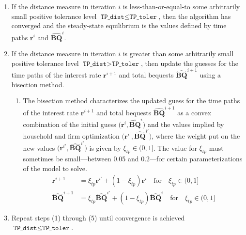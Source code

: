 \documentclass[letterpaper,12pt]{article}
\theoremstyle{definition}
\begin{document}
\begin{enumerate}
\begin{enumerate}
        \item If the distance measure in iteration $i$ is less-than-or-equal-to some arbitrarily small positive tolerance level $\texttt{TP\_dist}\leq\texttt{TP\_toler}$, then the algorithm has converged and the steady-state equilibrium is the values defined by time paths $\bm{r}^i$ and $\bm{\hat{BQ}}^i$.

        \item If the distance measure in iteration $i$ is greater than some arbitrarily small positive tolerance level $\texttt{TP\_dist} > \texttt{TP\_toler}$, then update the guesses for the time paths of the interest rate $\bm{r}^{i+1}$ and total bequests $\bm{\hat{BQ}}^{i+1}$ using a bisection method.
        \begin{enumerate}
          \item The bisection method characterizes the updated guess for the time paths of the interest rate $\bm{r}^{i+1}$ and total bequests $\bm{\hat{BQ}}^{i+1}$ as a convex combination of the initial guess $\bigl(\bm{r}^{i},\bm{\hat{BQ}}^i\bigr)$ and the values implied by household and firm optimization $\bigl(\bm{r}^{i'},\bm{\hat{BQ}}^{i'}\bigr)$, where the weight put on the new values $\bigl(\bm{r}^{i'},\bm{\hat{BQ}}^{i'}\bigr)$ is given by $\xi_{tp}\in(0, 1]$. The value for $\xi_{tp}$ must sometimes be small---between 0.05 and 0.2---for certain parameterizations of the model to solve.
          \begin{align}
            \bm{r}^{i+1} &= \xi_{tp}\bm{r}^{i'} + (1 - \xi_{tp})\bm{r}^{i} \quad\text{for}\quad \xi_{tp}\in(0,1] \label{EqOGmodelUpdate_r_tp} \\
            \bm{\hat{BQ}}^{i+1} &= \xi_{tp}\bm{\hat{BQ}}^{i'} + (1 - \xi_{tp})\bm{\hat{BQ}}^{i} \quad\text{for}\quad \xi_{tp}\in(0,1] \label{EqOGmodelUpdate_BQ_tp}
          \end{align}

        \end{enumerate}

        \item Repeat steps (1) through (5) until convergence is achieved $\texttt{TP\_dist}\leq\texttt{TP\_toler}$.

      \end{enumerate}
    \end{enumerate}

\end{document}

